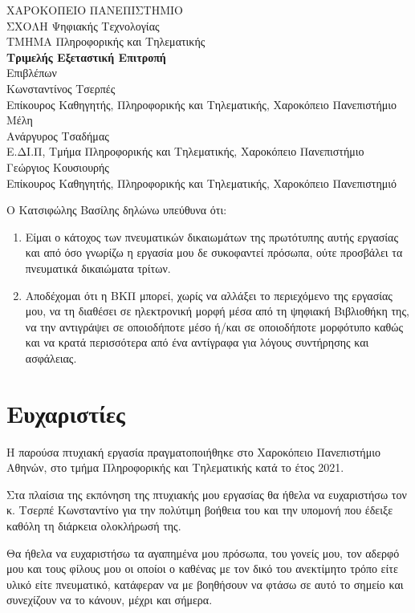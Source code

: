   \begin{center}
    {\huge ΧΑΡΟΚΟΠΕΙΟ ΠΑΝΕΠΙΣΤΗΜΙΟ}\\
    \vspace{4cm}
    ΣΧΟΛΗ Ψηφιακής Τεχνολογίας \\
    ΤΜΗΜΑ Πληροφορικής και Τηλεματικής\\
    \vspace{4cm}
    \textbf{Τριμελής Εξεταστική Επιτροπή}\\
    
 	Επιβλέπων\\
    Κωνσταντίνος Τσερπές\\
    Επίκουρος Καθηγητής, Πληροφορικής και Τηλεματικής, Χαροκόπειο Πανεπιστήμιο\\[1\baselineskip]
    Μέλη\\
    Ανάργυρος Τσαδήμας\\
    Ε.ΔΙ.Π, Τμήμα Πληροφορικής και Τηλεματικής, Χαροκόπειο Πανεπιστήμιο\\[1\baselineskip]
    Γεώργιος Κουσιουρής\\
    Επίκουρος Καθηγητής, Πληροφορικής και Τηλεματικής, Χαροκόπειο Πανεπιστημιό\\
   
  \end{center}
\pagebreak

Ο Κατσιφώλης Βασίλης δηλώνω υπεύθυνα ότι:

\begin{enumerate}
\item Είμαι ο κάτοχος των πνευματικών δικαιωμάτων της πρωτότυπης αυτής εργασίας και από όσο γνωρίζω η εργασία μου δε συκοφαντεί πρόσωπα, ούτε προσβάλει τα πνευματικά δικαιώματα τρίτων.
\item Αποδέχομαι ότι η ΒΚΠ μπορεί, χωρίς να αλλάξει το περιεχόμενο της εργασίας μου, να τη διαθέσει σε ηλεκτρονική μορφή μέσα από τη ψηφιακή Βιβλιοθήκη της, να την αντιγράψει σε οποιοδήποτε μέσο ή/και σε οποιοδήποτε μορφότυπο καθώς και να κρατά περισσότερα από ένα αντίγραφα για λόγους συντήρησης και ασφάλειας.
\end{enumerate}

\pagebreak
\section*{Ευχαριστίες}
Η παρούσα πτυχιακή εργασία πραγματοποιήθηκε στο Χαροκόπειο Πανεπιστήμιο Αθηνών, στο τμήμα Πληροφορικής και Τηλεματικής κατά το έτος 2021.

Στα πλαίσια της εκπόνηση της πτυχιακής μου εργασίας θα ήθελα να ευχαριστήσω τον κ. Τσερπέ Κωνσταντίνο για την πολύτιμη βοήθεια του και την υπομονή που έδειξε καθόλη τη διάρκεια ολοκλήρωσή της.

Θα ήθελα να ευχαριστήσω τα αγαπημένα μου πρόσωπα, του γονείς μου, τον αδερφό μου και τους φίλους μου οι οποίοι ο καθένας με τον δικό του ανεκτίμητο τρόπο είτε υλικό είτε πνευματικό, κατάφεραν να με βοηθήσουν να φτάσω σε αυτό το σημείο και συνεχίζουν να το κάνουν, μέχρι και σήμερα.


\pagebreak
